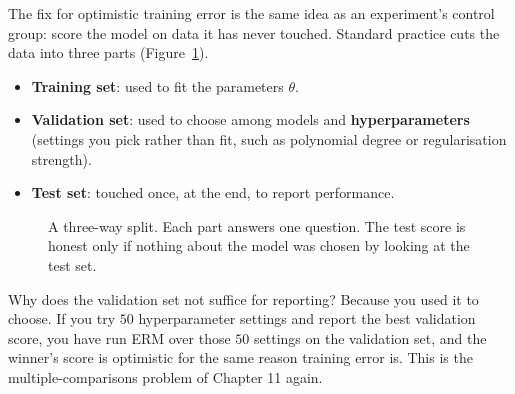 The fix for optimistic training error is the same idea as an experiment's control group: score
the model on data it has never touched. Standard practice cuts the data into three parts
(Figure~\ref{fig:ml-split}).

\begin{itemize}
  \item \textbf{Training set}: used to fit the parameters $\theta$.
  \item \textbf{Validation set}: used to choose among models and \textbf{hyperparameters}
  (settings you pick rather than fit, such as polynomial degree or regularisation strength).
  \item \textbf{Test set}: touched once, at the end, to report performance.
\end{itemize}

\begin{figure}[H]
\centering
{}
\caption{A three-way split. Each part answers one question. The test score is honest only if
nothing about the model was chosen by looking at the test set.}
\label{fig:ml-split}
\end{figure}

Why does the validation set not suffice for reporting? Because you used it to choose. If you
try $50$ hyperparameter settings and report the best validation score, you have run ERM over
those $50$ settings on the validation set, and the winner's score is optimistic for the same
reason training error is. This is the multiple-comparisons problem of Chapter 11 again.

